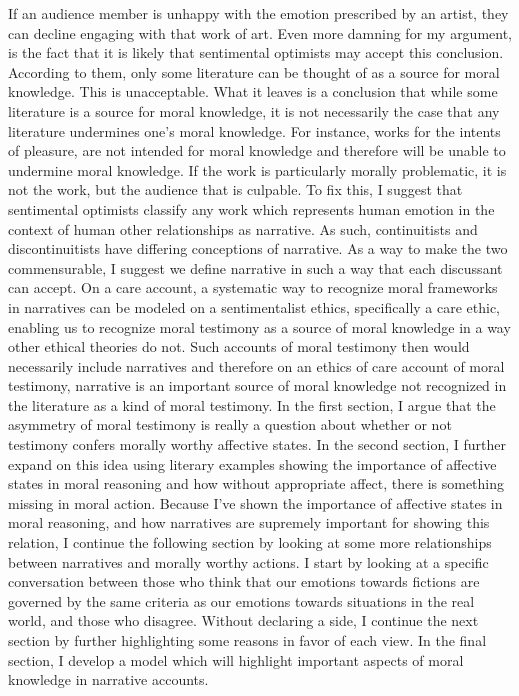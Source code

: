 \documentclass[phdthesis,12pt,final]{wuthesis}
\theoremstyle{definition}
\theoremstyle{definition}
\theoremstyle{definition}
\theoremstyle{definition}
\theoremstyle{remark}
\begin{document}
If an audience member is unhappy with the emotion prescribed by an artist, they can decline engaging with that work of art. Even more damning for my argument, is the fact that it is likely that sentimental optimists may accept this conclusion. According to them, only some literature can be thought of as a source for moral knowledge. This is unacceptable. What it leaves is a conclusion that while some literature is a source for moral knowledge, it is not necessarily the case that any literature undermines one's moral knowledge. For instance, works for the intents of pleasure, are not intended for moral knowledge and therefore will be unable to undermine moral knowledge. If the work is particularly morally problematic, it is not the work, but the audience that is culpable. To fix this, I suggest that sentimental optimists classify any work which represents human emotion in the context of human other relationships as narrative. As such, continuitists and discontinuitists have differing conceptions of narrative. As a way to make the two commensurable, I suggest we define narrative in such a way that each discussant can accept. On a care account, a systematic way to recognize moral frameworks in narratives can be modeled on a sentimentalist ethics, specifically a care ethic, enabling us to recognize moral testimony as a source of moral knowledge in a way other ethical theories do not. Such accounts of moral testimony then would necessarily include narratives and therefore on an ethics of care account of moral testimony, narrative is an important source of moral knowledge not recognized in the literature as a kind of moral testimony. In the first section, I argue that the asymmetry of moral testimony is really a question about whether or not testimony confers morally worthy affective states. In the second section, I further expand on this idea using literary examples showing the importance of affective states in moral reasoning and how without appropriate affect, there is something missing in moral action. Because I've shown the importance of affective states in moral reasoning, and how narratives are supremely important for showing this relation, I continue the following section by looking at some more relationships between narratives and morally worthy actions. I start by looking at a specific conversation between those who think that our emotions towards fictions are governed by the same criteria as our emotions towards situations in the real world, and those who disagree. Without declaring a side, I continue the next section by further highlighting some reasons in favor of each view. In the final section, I develop a model which will highlight important aspects of moral knowledge in narrative accounts.
\end{document}
